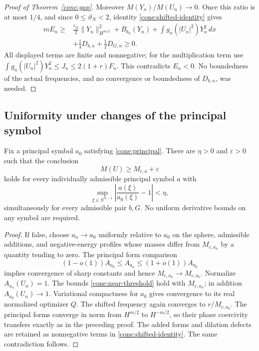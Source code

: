 \begin{proof}[Proof of Theorem~\ref{cone:gap}]
Moreover \(M(Y_n)/M(U_n)\to0\). Once this ratio is at most \(1/4\),
and since \(0\le\vartheta_N<2\), identity
\eqref{cone:shifted-identity} gives
\[
\begin{aligned}
mE_n\ge{}&
\frac{c_Q}{2}\|Y_n\|_{H^{m/2}}^2+B_{b_n}(Y_n)
+\int g_n(|U_n|^2)Y_n^2\,dx\\
&+\frac14D_{b,n}+\frac12D_{G,n}\ge0.
\end{aligned}
\]
All displayed terms are finite and nonnegative; for the
multiplication term use
\(\int g_n(|U_n|^2)Y_n^2\le J_n\le2(1+r)F_n\).
This contradicts \(E_n<0\). No boundedness of the actual
frequencies, and no convergence or boundedness of \(D_{b,n}\),
was needed.
\end{proof}

\subsection{Uniformity under changes of the principal symbol}

\begin{theorem}\label{cone:robustness}
Fix a principal symbol \(a_0\) satisfying
\eqref{cone:principal}. There are \(\eta>0\) and
\(\varepsilon>0\) such that the conclusion
\[
M(U)\ge M_{c,a}+\varepsilon
\]
holds for every individually admissible principal symbol \(a\)
with
\[
\sup_{\xi\in S^{N-1}}\left|\frac{a(\xi)}{a_0(\xi)}-1\right|<\eta,
\]
simultaneously for every admissible pair \(b,G\).
No uniform derivative bounds on any symbol are required.
\end{theorem}
\begin{proof}
If false, choose \(a_n\to a_0\) uniformly relative to \(a_0\)
on the sphere, admissible additions, and negative-energy profiles
whose masses differ from \(M_{c,a_n}\) by a quantity tending to
zero. The principal form comparison
\[
(1-o(1))A_{a_0}\le A_{a_n}\le(1+o(1))A_{a_0}
\]
implies convergence of sharp constants and hence
\(M_{c,a_n}\to M_{c,a_0}\). Normalize \(A_{a_n}(U_n)=1\).
The bounds \eqref{cone:near-threshold} hold with \(M_{c,a_n}\);
in addition \(A_{a_0}(U_n)\to1\). Variational compactness for
\(a_0\) gives convergence to its real normalized optimizer \(Q\).
The shifted frequency again converges to \(r/M_{c,a_0}\).
The principal forms converge in norm from \(H^{m/2}\) to
\(H^{-m/2}\), so their phase coercivity transfers exactly as in
the preceding proof. The added forms and dilation defects are
retained as nonnegative terms in
\eqref{cone:shifted-identity}. The same contradiction follows.
\end{proof}

